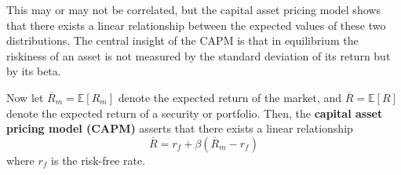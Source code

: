 \documentclass{article}
\begin{document}
    This may or may not be correlated, but the capital asset pricing model shows that there exists a linear relationship between the expected values of these two distributions. The central insight of the CAPM is that in equilibrium the riskiness of an asset is not measured by the standard deviation of its return but by its beta. 

    \begin{theorem}[CAPM]
      Now let $\overline{R}_m = \mathbb{E}[R_m]$ denote the expected return of the market, and $\overline{R} = \mathbb{E}[R]$ denote the expected return of a security or portfolio. Then, the \textbf{capital asset pricing model (CAPM)} asserts that there exists a linear relationship 
      \begin{equation}
        \overline{R} = r_f + \beta (\overline{R}_m - r_f)
      \end{equation}
      where $r_f$ is the risk-free rate. 
    \end{theorem}
\end{document}
